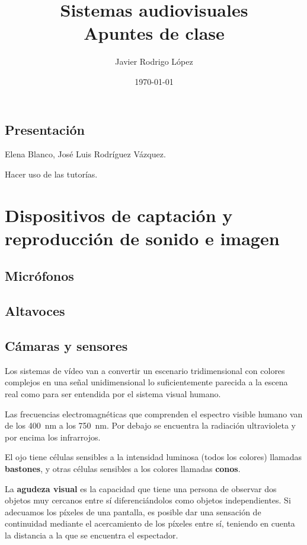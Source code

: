 \documentclass[10pt]{book}
\title{\Huge Sistemas audiovisuales\\\huge Apuntes de clase}
\author{Javier Rodrigo López}
\date{\today}
\begin{document}
\maketitle

\tableofcontents


\newpage

\section*{Presentación}

Elena Blanco, José Luis Rodríguez Vázquez.

Hacer uso de las tutorías.

\newpage



\chapter{Dispositivos de captación y reproducción de sonido e imagen}

\section{Micrófonos}

\section{Altavoces}

\section{Cámaras y sensores}

Los sistemas de vídeo van a convertir un escenario tridimensional con colores complejos en una señal unidimensional lo suficientemente parecida a la escena real como para ser entendida por el sistema visual humano.

Las frecuencias electromagnéticas que comprenden el espectro visible humano van de los \SI{400}{\nano\metre} a los \SI{750}{\nano\metre}. Por debajo se encuentra la radiación ultravioleta y por encima los infrarrojos.

El ojo tiene células sensibles a la intensidad luminosa (todos los colores) llamadas \textbf{bastones}, y otras células sensibles a los colores llamadas \textbf{conos}.

La \textbf{agudeza visual} es la capacidad que tiene una persona de observar dos objetos muy cercanos entre sí diferenciándolos como objetos independientes. Si adecuamos los píxeles de una pantalla, es posible dar una sensación de continuidad mediante el acercamiento de los píxeles entre sí, teniendo en cuenta la distancia a la que se encuentra el espectador.
\end{document}
